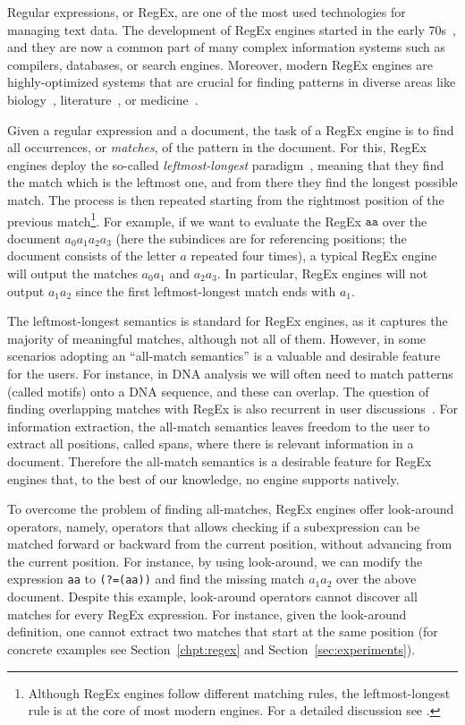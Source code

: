 
Regular expressions, or RegEx, are one of the most used technologies for managing text data. The development of RegEx engines started in the early 70s~\cite{thompson1968programming,earlyNFA}, and they are now a common part of many complex information systems such as compilers, databases, or search engines. Moreover, modern RegEx engines are highly-optimized systems that are crucial for finding patterns in diverse areas like biology~\cite{Gonzalo}, literature~\cite{lit1}, or medicine~\cite{FloresFP21}. 


Given a regular expression and a document, the task of a RegEx engine is to find all occurrences, or \emph{matches}, of the pattern in the document. For this, RegEx engines deploy the so-called \emph{leftmost-longest} paradigm~\cite{posix}, meaning that they find the match which is the leftmost one, and from there they find the longest possible match. The process is then repeated  starting from the rightmost position of the previous match\footnote{Although RegEx engines follow different matching rules, the leftmost-longest rule is at the core of most modern engines. For a detailed discussion see \cite{friedl2006mastering}.}. For example, if we want to evaluate the RegEx $\texttt{aa}$ over the document $a_0 a_1 a_2 a_3$ (here the subindices are for referencing positions; the document consists of the letter $a$ repeated four times), a typical RegEx engine will output the matches $a_0a_1$ and $a_2a_3$. In particular, RegEx engines will not output $a_1a_2$ since the first leftmost-longest match ends with $a_1$. 

The leftmost-longest semantics is standard for  RegEx engines, as it captures the majority of meaningful matches, although not all of them. However, in some scenarios adopting an ``all-match semantics'' is a valuable and desirable feature for the users. For instance, in DNA analysis we will often need to match patterns (called motifs) onto a DNA sequence, and these can overlap. The question of finding overlapping matches with RegEx is also recurrent in user discussions~\cite{overlap1,overlap2,overlap3}. For information extraction, the all-match semantics leaves freedom to the user to extract all positions, called spans, where there is relevant information in a document. Therefore the all-match semantics is a desirable feature for RegEx engines that, to the best of our knowledge, no engine supports natively.

To overcome the problem of finding all-matches, RegEx engines offer look-around operators, namely, operators that allows checking if a subexpression can be matched forward or backward from the current position, without advancing from the current position. For instance, by using look-around, we can modify the expression \texttt{aa} to \texttt{(?=(aa))} and find the missing match $a_1a_2$ over the above document. Despite this example, look-around operators cannot discover all matches for every RegEx expression. For instance, given the look-around definition, one cannot extract two matches that start at the same position (for concrete examples see Section~\ref{chpt:regex} and Section~\ref{sec:experiments}).

